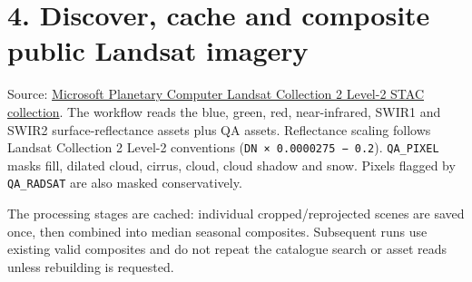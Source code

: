 \documentclass[
]{article}
\begin{document}
\section{4. Discover, cache and composite public Landsat
imagery}\label{discover-cache-and-composite-public-landsat-imagery}

Source:
\href{https://planetarycomputer.microsoft.com/dataset/landsat-c2-l2}{Microsoft
Planetary Computer Landsat Collection 2 Level-2 STAC collection}. The
workflow reads the blue, green, red, near-infrared, SWIR1 and SWIR2
surface-reflectance assets plus QA assets. Reflectance scaling follows
Landsat Collection 2 Level-2 conventions
(\texttt{DN\ ×\ 0.0000275\ −\ 0.2}). \texttt{QA\_PIXEL} masks fill,
dilated cloud, cirrus, cloud, cloud shadow and snow. Pixels flagged by
\texttt{QA\_RADSAT} are also masked conservatively.

The processing stages are cached: individual cropped/reprojected scenes
are saved once, then combined into median seasonal composites.
Subsequent runs use existing valid composites and do not repeat the
catalogue search or asset reads unless rebuilding is requested.
\end{document}
